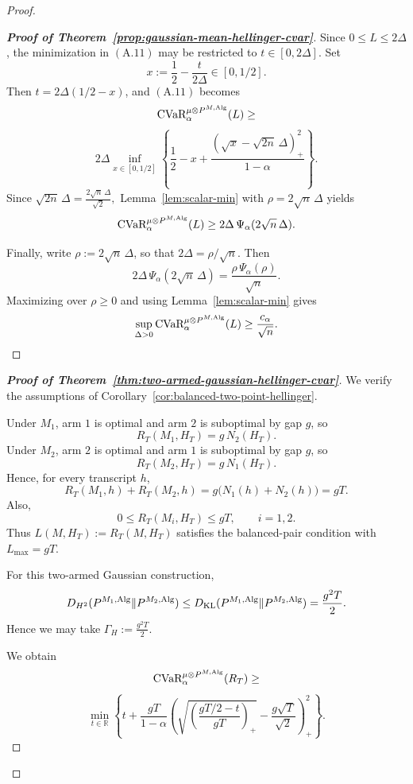 \documentclass[conference]{IEEEtran}
\begin{document}
\begin{proof}[Proof]
\begin{proof}[\textbf{Proof of Theorem~\ref{prop:gaussian-mean-hellinger-cvar}}]
\medskip
\noindent
{}
Since \(0\le L\le 2\Delta\), the minimization in \((\mathrm{A.11})\) may be restricted to \(t\in[0,2\Delta]\). Set
\[
x:=\frac12-\frac{t}{2\Delta}\in[0,1/2].
\]
Then \(t=2\Delta(1/2-x)\), and \((\mathrm{A.11})\) becomes
\[
\textup{CVaR}_\alpha^{\mu\otimes P^{M,\textup{Alg}}}(L)
\ge\]
\[
2\Delta
\inf_{x\in[0,1/2]}
\left\{
\frac12-x+\frac{(\sqrt{x}-\sqrt{2n}\,\Delta)_+^2}{1-\alpha}
\right\}.
\]
Since
\(
\sqrt{2n}\,\Delta=\frac{2\sqrt n\,\Delta}{\sqrt2},
\)
Lemma~\ref{lem:scalar-min} with \(\rho=2\sqrt n\,\Delta\) yields
\[
\textup{CVaR}_\alpha^{\mu\otimes P^{M,\textup{Alg}}}(L)
\ge
2\Delta\,\Psi_\alpha(2\sqrt n\,\Delta).
\]

Finally, write \(\rho:=2\sqrt n\,\Delta\), so that \(2\Delta=\rho/\sqrt n\). Then
\[
2\Delta\,\Psi_\alpha(2\sqrt n\,\Delta)=\frac{\rho\,\Psi_\alpha(\rho)}{\sqrt n}.
\]
Maximizing over \(\rho\ge 0\) and using Lemma~\ref{lem:scalar-min} gives
\[
\sup_{\Delta>0}
\textup{CVaR}_\alpha^{\mu\otimes P^{M,\textup{Alg}}}(L)
\ge
\frac{c_\alpha}{\sqrt n}.
\]
\end{proof}

\begin{proof}[\textbf{Proof of Theorem~\ref{thm:two-armed-gaussian-hellinger-cvar}}]
We verify the assumptions of Corollary~\ref{cor:balanced-two-point-hellinger}.

\medskip
\noindent
{}
Under \(M_1\), arm \(1\) is optimal and arm \(2\) is suboptimal by gap \(g\), so
\[
R_T(M_1,H_T)=g\,N_2(H_T).
\]
Under \(M_2\), arm \(2\) is optimal and arm \(1\) is suboptimal by gap \(g\), so
\[
R_T(M_2,H_T)=g\,N_1(H_T).
\]
Hence, for every transcript \(h\),
\[
R_T(M_1,h)+R_T(M_2,h)
=
g\bigl(N_1(h)+N_2(h)\bigr)
=
gT.
\]
Also,
\[
0\le R_T(M_i,H_T)\le gT,\qquad i=1,2.
\]
Thus \(L(M,H_T):=R_T(M,H_T)\) satisfies the balanced-pair condition with \(L_{\max}=gT\).

\medskip
\noindent
{}
For this two-armed Gaussian construction,
\[
D_{H^2}(P^{M_1,\textup{Alg}}\|P^{M_2,\textup{Alg}})
\le
D_{\textup{KL}}(P^{M_1,\textup{Alg}}\|P^{M_2,\textup{Alg}})
=
\frac{g^2T}{2}.
\]
Hence we may take
\(
\Gamma_H:=\frac{g^2T}{2}.
\)

\medskip
\noindent
{}
We obtain
\[
\textup{CVaR}_\alpha^{\mu\otimes P^{M,\textup{Alg}}}(R_T)
\ge\]
\[
\min_{t\in\mathbb R}
\left\{
t+\frac{gT}{1-\alpha}
\left(
\sqrt{\left(\frac{gT/2-t}{gT}\right)_+}
-
\frac{g\sqrt{T}}{\sqrt2}
\right)_+^2
\right\}.
\tag{A.12}
\]


\end{proof}
\end{proof}
\end{document}
